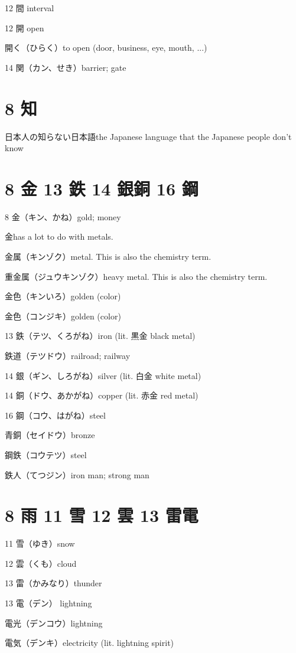 12 間 interval

12 開 open

開く（ひらく）to open (door, business, eye, mouth, ...)

14 関（カン、せき）barrier; gate

\section{8 知}

日本人の知らない日本語the Japanese language that the Japanese people don't know

\section{8 金 13 鉄 14 銀銅 16 鋼}

8 金（キン、かね）gold; money

金has a lot to do with metals.

金属（キンゾク）metal. This is also the chemistry term.

重金属（ジュウキンゾク）heavy metal. This is also the chemistry term.

金色（キンいろ）golden (color)

金色（コンジキ）golden (color)

13 鉄（テツ、くろがね）iron (lit. 黒金 black metal)

鉄道（テツドウ）railroad; railway

14 銀（ギン、しろがね）silver (lit. 白金 white metal)

14 銅（ドウ、あかがね）copper (lit. 赤金 red metal)

16 鋼（コウ、はがね）steel

青銅（セイドウ）bronze

鋼鉄（コウテツ）steel

鉄人（てつジン）iron man; strong man

\section{8 雨 11 雪 12 雲 13 雷電}

11 雪（ゆき）snow

12 雲（くも）cloud

13 雷（かみなり）thunder

13 電（デン） lightning

電光（デンコウ）lightning

電気（デンキ）electricity (lit. lightning spirit)


